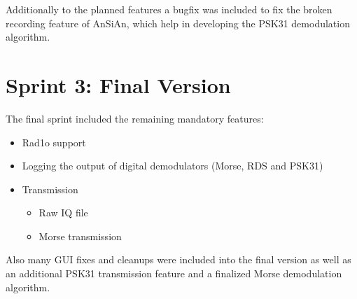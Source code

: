 Additionally to the planned features a bugfix was included to fix the
broken recording feature of \ac{AnSiAn}, which help in developing the
PSK31 demodulation algorithm.

\section{Sprint 3: Final Version}

The final sprint included the remaining mandatory features:
\begin{itemize}
	\item Rad1o support
	\item Logging the output of digital demodulators (Morse, RDS and PSK31)
	\item Transmission
		\begin{itemize}
			\item Raw IQ file
			\item Morse transmission
		\end{itemize}
\end{itemize}

Also many \ac{GUI} fixes and cleanups were included into the final version
as well as an additional PSK31 transmission feature and a finalized
Morse demodulation algorithm.

